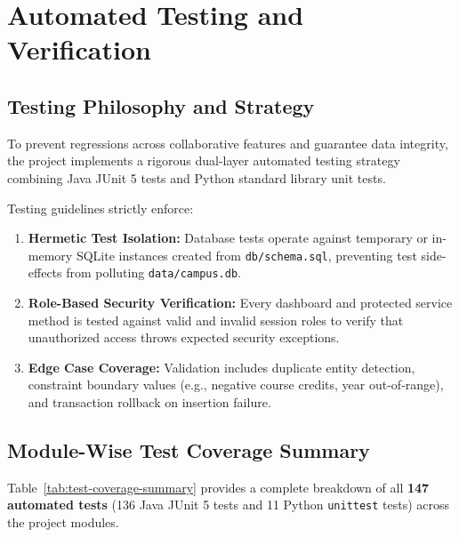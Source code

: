 \section{Automated Testing and Verification}
\label{sec:testing}

\subsection{Testing Philosophy and Strategy}
To prevent regressions across collaborative features and guarantee data integrity, the project implements a rigorous dual-layer automated testing strategy combining Java JUnit 5 tests and Python standard library unit tests.

Testing guidelines strictly enforce:
\begin{enumerate}
    \item \textbf{Hermetic Test Isolation:} Database tests operate against temporary or in-memory SQLite instances created from \texttt{db/schema.sql}, preventing test side-effects from polluting \texttt{data/campus.db}.
    \item \textbf{Role-Based Security Verification:} Every dashboard and protected service method is tested against valid and invalid session roles to verify that unauthorized access throws expected security exceptions.
    \item \textbf{Edge Case Coverage:} Validation includes duplicate entity detection, constraint boundary values (e.g., negative course credits, year out-of-range), and transaction rollback on insertion failure.
\end{enumerate}

\subsection{Module-Wise Test Coverage Summary}
Table~\ref{tab:test-coverage-summary} provides a complete breakdown of all \textbf{147 automated tests} (136 Java JUnit 5 tests and 11 Python \texttt{unittest} tests) across the project modules.

